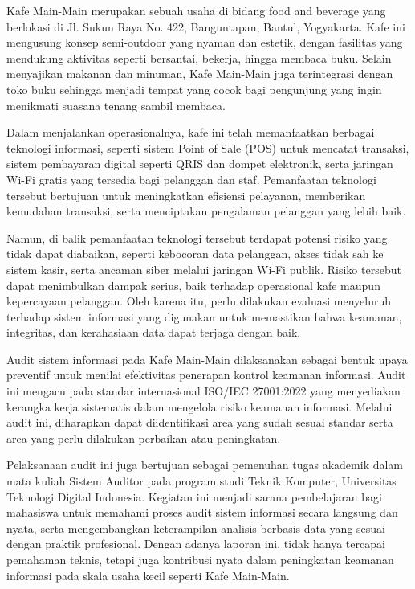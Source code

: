 \documentclass[12pt, a4paper]{report}
\begin{document}
Kafe Main-Main merupakan sebuah usaha di bidang food and beverage yang berlokasi di Jl. Sukun Raya No. 422, Banguntapan, Bantul, Yogyakarta. Kafe ini mengusung konsep semi-outdoor yang nyaman dan estetik, dengan fasilitas yang mendukung aktivitas seperti bersantai, bekerja, hingga membaca buku. Selain menyajikan makanan dan minuman, Kafe Main-Main juga terintegrasi dengan toko buku sehingga menjadi tempat yang cocok bagi pengunjung yang ingin menikmati suasana tenang sambil membaca.

Dalam menjalankan operasionalnya, kafe ini telah memanfaatkan berbagai teknologi informasi, seperti sistem Point of Sale (POS) untuk mencatat transaksi, sistem pembayaran digital seperti QRIS dan dompet elektronik, serta jaringan Wi-Fi gratis yang tersedia bagi pelanggan dan staf. Pemanfaatan teknologi tersebut bertujuan untuk meningkatkan efisiensi pelayanan, memberikan kemudahan transaksi, serta menciptakan pengalaman pelanggan yang lebih baik.

Namun, di balik pemanfaatan teknologi tersebut terdapat potensi risiko yang tidak dapat diabaikan, seperti kebocoran data pelanggan, akses tidak sah ke sistem kasir, serta ancaman siber melalui jaringan Wi-Fi publik. Risiko tersebut dapat menimbulkan dampak serius, baik terhadap operasional kafe maupun kepercayaan pelanggan. Oleh karena itu, perlu dilakukan evaluasi menyeluruh terhadap sistem informasi yang digunakan untuk memastikan bahwa keamanan, integritas, dan kerahasiaan data dapat terjaga dengan baik.

Audit sistem informasi pada Kafe Main-Main dilaksanakan sebagai bentuk upaya preventif untuk menilai efektivitas penerapan kontrol keamanan informasi. Audit ini mengacu pada standar internasional ISO/IEC 27001:2022 yang menyediakan kerangka kerja sistematis dalam mengelola risiko keamanan informasi. Melalui audit ini, diharapkan dapat diidentifikasi area yang sudah sesuai standar serta area yang perlu dilakukan perbaikan atau peningkatan.

Pelaksanaan audit ini juga bertujuan sebagai pemenuhan tugas akademik dalam mata kuliah Sistem Auditor pada program studi Teknik Komputer, Universitas Teknologi Digital Indonesia. Kegiatan ini menjadi sarana pembelajaran bagi mahasiswa untuk memahami proses audit sistem informasi secara langsung dan nyata, serta mengembangkan keterampilan analisis berbasis data yang sesuai dengan praktik profesional. Dengan adanya laporan ini, tidak hanya tercapai pemahaman teknis, tetapi juga kontribusi nyata dalam peningkatan keamanan informasi pada skala usaha kecil seperti Kafe Main-Main.
\end{document}
